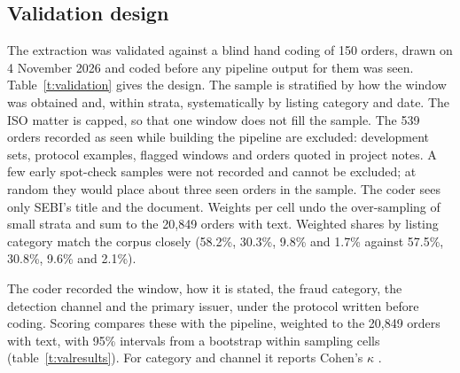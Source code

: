 \documentclass[letterpaper,11pt,leqno]{article}
\begin{document}
\subsection{Validation design}\label{s:validation}

The extraction was validated against a blind hand coding of 150 orders, drawn on 4 November 2026 and coded before any pipeline output for them was seen. Table~\ref{t:validation} gives the design. The sample is stratified by how the window was obtained and, within strata, systematically by listing category and date. The ISO matter is capped, so that one window does not fill the sample. The 539 orders recorded as seen while building the pipeline are excluded: development sets, protocol examples, flagged windows and orders quoted in project notes. A few early spot-check samples were not recorded and cannot be excluded; at random they would place about three seen orders in the sample. The coder sees only SEBI's title and the document. Weights per cell undo the over-sampling of small strata and sum to the 20,849 orders with text. Weighted shares by listing category match the corpus closely (58.2\%, 30.3\%, 9.8\% and 1.7\% against 57.5\%, 30.8\%, 9.6\% and 2.1\%).

\begin{table}[t]
\caption{Design of the blind validation sample}

\label{t:validation}\end{table}

The coder recorded the window, how it is stated, the fraud category, the detection channel and the primary issuer, under the protocol written before coding. Scoring compares these with the pipeline, weighted to the 20,849 orders with text, with 95\% intervals from a bootstrap within sampling cells (table~\ref{t:valresults}). For category and channel it reports Cohen's $\kappa$ \citep{C60}.
\end{document}
